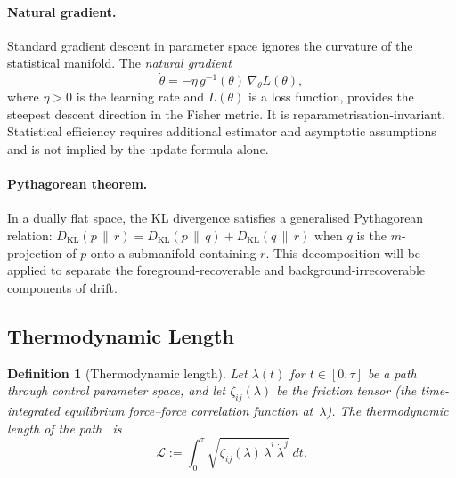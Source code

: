 \documentclass[12pt,a4paper,openany]{book}
\newtheorem{definition}[theorem]{Definition}
\begin{document}
\paragraph{Natural gradient.}
Standard gradient descent in parameter space ignores the
curvature of the statistical manifold.
The \emph{natural gradient}~\cite{Amari1998}
\begin{equation}
\label{III-eq:natural_gradient}
\dot{\theta}
= -\eta\,g^{-1}(\theta)\,\nabla_\theta L(\theta),
\end{equation}
where $\eta > 0$ is the learning rate and $L(\theta)$ is a
loss function, provides the steepest descent direction in the
Fisher metric.
It is reparametrisation-invariant.  Statistical efficiency requires
additional estimator and asymptotic assumptions and is not implied by
the update formula alone.

\paragraph{Pythagorean theorem.}
In a dually flat space, the KL divergence satisfies
a generalised Pythagorean relation:
$D_{\mathrm{KL}}(p\,\|\,r)
= D_{\mathrm{KL}}(p\,\|\,q)
+ D_{\mathrm{KL}}(q\,\|\,r)$
when $q$ is the $m$-projection of $p$ onto a
submanifold containing $r$.
This decomposition will be applied to separate the
foreground-recoverable and background-irrecoverable
components of drift.

\subsection{Thermodynamic Length}
\label{III-subsec:thermo_length}

\begin{definition}[Thermodynamic length]
\label{III-def:thermo_length}
Let $\lambda(t)$ for $t \in [0,\tau]$ be a path through
control parameter space, and let $\zeta_{ij}(\lambda)$ be the
\emph{friction tensor} (the time-integrated equilibrium
force--force correlation function at~$\lambda$).
The \emph{thermodynamic length} of the
path~\cite{Crooks2007} is
\begin{equation}
\label{III-eq:thermo_length}
\mathcal{L}
:= \int_0^\tau
\sqrt{\zeta_{ij}(\lambda)\,
  \dot{\lambda}^i\,\dot{\lambda}^j}\;dt.
\end{equation}
\end{definition}
\end{document}
